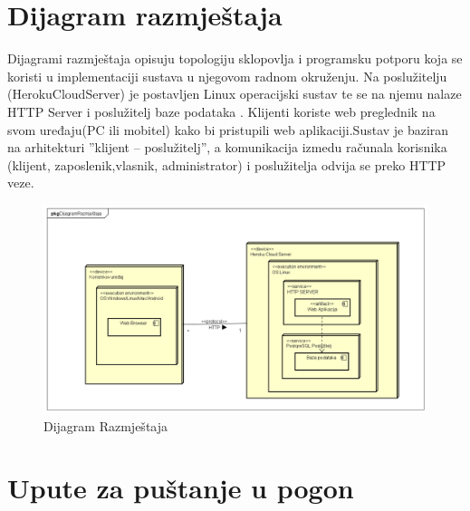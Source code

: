 \section{Dijagram razmještaja}
	

	
	\text Dijagrami razmještaja opisuju topologiju sklopovlja i programsku potporu koja se koristi u implementaciji sustava u njegovom radnom okruženju. Na poslužitelju
	(HerokuCloudServer) je postavljen Linux operacijski sustav te se na njemu nalaze HTTP Server i poslužitelj baze podataka . Klijenti koriste web preglednik na svom uređaju(PC ili mobitel) kako bi pristupili web aplikaciji.Sustav je baziran na arhitekturi ”klijent – poslužitelj”, a komunikacija izmedu računala korisnika (klijent, zaposlenik,vlasnik, administrator) i poslužitelja odvija se preko HTTP veze.  

		\begin{figure}[H]
			\includegraphics[scale=0.5]{slike/Dijagram Razmjestaja.png} %
			\centering
			\caption { Dijagram Razmještaja}
			\label{fig:5.1}
			\end{figure}

\newpage


\section{Upute za puštanje u pogon}


